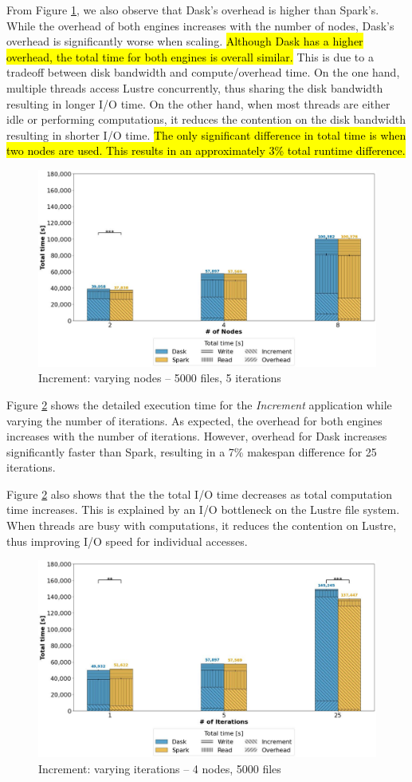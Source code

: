 \documentclass[AMA,STIX1COL]{WileyNJD-v2}
\newcommand{\HL}[1]{\hl{#1}}
\begin{document}
From Figure \ref{fig:increment_worker}, we also observe that Dask's overhead is higher than Spark's.
While the overhead of both engines increases with the number of nodes, Dask's overhead is significantly worse when scaling.
\HL{Although Dask has a higher overhead, the total time for both engines is overall similar.}
This is due to a tradeoff between disk bandwidth and compute/overhead time.
On the one hand, multiple threads access Lustre concurrently, thus sharing the disk bandwidth resulting in longer I/O time.
On the other hand, when most threads are either idle or performing computations, it reduces the contention on the disk bandwidth resulting in shorter I/O time.
\HL{The only significant difference in total time is when two nodes are used.
	This results in an approximately 3\% total runtime difference.}
\begin{figure}[!h]
	\centering
	\includegraphics[clip,width=0.75\columnwidth]{figures/stacked_increment_worker.jpg}
	\caption{Increment: varying nodes -- 5000 files, 5 iterations}
	\label{fig:increment_worker}
\end{figure}
							
Figure \ref{fig:increment_itr} shows the detailed execution time for the \textit{Increment} application while varying the number of iterations.
As expected, the overhead for both engines increases with the number of iterations.
However, overhead for Dask increases significantly faster than Spark, resulting in a 7\% makespan difference for 25 iterations.
							
Figure \ref{fig:increment_itr} also shows that the the total I/O time decreases as total computation time increases.
This is explained by an I/O bottleneck on the Lustre file system.
When threads are busy with computations, it reduces the contention on Lustre, thus improving I/O speed for individual accesses.
\begin{figure}[!h]
	\centering
	\includegraphics[clip,width=0.75\columnwidth]{figures/stacked_increment_itr.jpg}
	\caption{Increment: varying iterations -- 4 nodes, 5000 files}
	\label{fig:increment_itr}
\end{figure}
							
\end{document}
